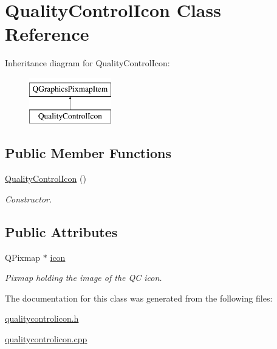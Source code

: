 \hypertarget{classQualityControlIcon}{\section{Quality\-Control\-Icon Class Reference}
\label{classQualityControlIcon}
}
Inheritance diagram for Quality\-Control\-Icon\-:\begin{figure}[H]
\begin{center}
\leavevmode
\includegraphics[height=2.000000cm]{classQualityControlIcon}
\end{center}
\end{figure}
\subsection*{Public Member Functions}
\begin{DoxyCompactItemize}
\item 
\hypertarget{classQualityControlIcon_abc6bd22cb8fd253c3f777b7e0a970569}{\hyperlink{classQualityControlIcon_abc6bd22cb8fd253c3f777b7e0a970569}{Quality\-Control\-Icon} ()}\label{classQualityControlIcon_abc6bd22cb8fd253c3f777b7e0a970569}

\begin{DoxyCompactList}\small\item\em Constructor. \end{DoxyCompactList}\end{DoxyCompactItemize}
\subsection*{Public Attributes}
\begin{DoxyCompactItemize}
\item 
\hypertarget{classQualityControlIcon_a0b31fdbf5db70c271d23055cfb64190d}{Q\-Pixmap $\ast$ \hyperlink{classQualityControlIcon_a0b31fdbf5db70c271d23055cfb64190d}{icon}}\label{classQualityControlIcon_a0b31fdbf5db70c271d23055cfb64190d}

\begin{DoxyCompactList}\small\item\em Pixmap holding the image of the Q\-C icon. \end{DoxyCompactList}\end{DoxyCompactItemize}


The documentation for this class was generated from the following files\-:\begin{DoxyCompactItemize}
\item 
\hyperlink{qualitycontrolicon_8h}{qualitycontrolicon.\-h}\item 
\hyperlink{qualitycontrolicon_8cpp}{qualitycontrolicon.\-cpp}\end{DoxyCompactItemize}
